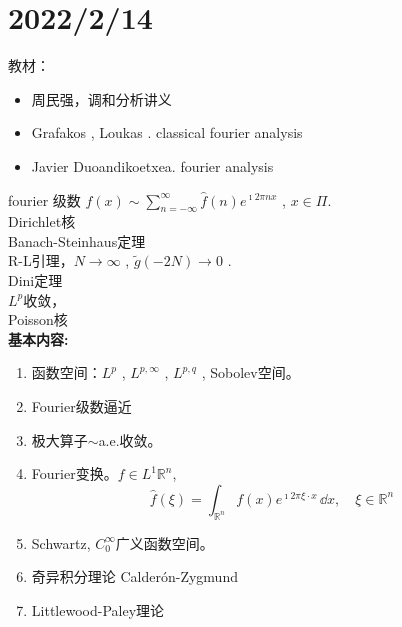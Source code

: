 \section{2022/2/14}
教材：
\begin{itemize}
    \item 周民强，调和分析讲义
    \item Grafakos , Loukas . classical fourier analysis
    \item Javier Duoandikoetxea. fourier analysis
\end{itemize}
fourier 级数 $f(x)\sim\sum_{n=-\infty}^{\infty}\hat{f}(n)e^{\imath 2\pi nx}$ , $x\in \Pi$.
\\
Dirichlet核
\\
Banach-Steinhaus定理
\\
R-L引理，$N\rightarrow\infty$ , $\tilde{g}(-2N)\rightarrow 0$ .
\\
Dini定理
\\
$L^p$收敛，
\\
Poisson核
\\
{\bfseries \large 基本内容:}
\begin{enumerate}
    \item 函数空间：$L^p$ , $L^{p,\infty}$ , $L^{p,q}$ , Sobolev空间。
    \item Fourier级数逼近
    \item 极大算子$\sim$a.e.收敛。
    \item Fourier变换。$f\in L^1{\mathbb{R}^n}$,
    \begin{equation*}
        \hat{f}(\xi)=\int_{\mathbb{R}^n} f(x)e^{\imath 2\pi \xi \cdot x}\,\dd x,\quad \xi\in \mathbb{R}^n
    \end{equation*}
    \item Schwartz, $C_0^{\infty}$广义函数空间。
    \item 奇异积分理论 Calder{\'o}n-Zygmund
    \item Littlewood-Paley理论
\end{enumerate}